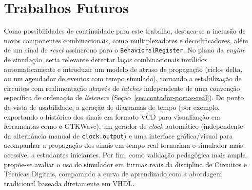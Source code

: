 \section{Trabalhos Futuros}

Como possibilidades de continuidade para este trabalho, destaca-se a inclusão de novos componentes combinacionais, como multiplexadores e decodificadores, além de um sinal de \textit{reset} assíncrono para o \texttt{BehavioralRegister}. No plano da \textit{engine} de simulação, seria relevante detectar laços combinacionais inválidos automaticamente e introduzir um modelo de atraso de propagação (ciclos delta, ou um agendador de eventos com tempo simulado), tornando a estabilização de circuitos com realimentação através de \textit{latches} independente de uma convenção específica de ordenação de \textit{listeners} (Seção~\ref{sec:contador-portas-real}). Do ponto de vista de usabilidade, a geração de diagramas de tempo (por exemplo, exportando o histórico dos sinais em formato VCD para visualização em ferramentas como o GTKWave), um gerador de \textit{clock} automático (independente da alternância manual de \texttt{clock.output}) e uma interface gráfica/visual para acompanhar a propagação dos sinais em tempo real tornariam o simulador mais acessível a estudantes iniciantes. Por fim, como validação pedagógica mais ampla, propõe-se avaliar o uso do simulador em turmas reais da disciplina de Circuitos e Técnicas Digitais, comparando a curva de aprendizado com a abordagem tradicional baseada diretamente em VHDL.
